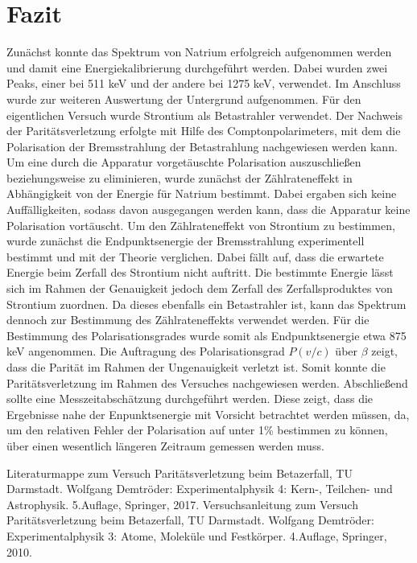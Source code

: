 \documentclass[twoside,colorback,accentcolor=tud4c,11pt]{tudreport}
\begin{document}
\chapter{Fazit}
Zunächst konnte das Spektrum von Natrium erfolgreich aufgenommen werden und damit eine Energiekalibrierung durchgeführt werden. Dabei wurden zwei Peaks, einer bei 511 keV und der andere bei 1275 keV, verwendet. Im Anschluss wurde zur weiteren Auswertung der Untergrund aufgenommen. Für den eigentlichen Versuch wurde Strontium als Betastrahler verwendet. Der Nachweis der Paritätsverletzung erfolgte mit Hilfe des Comptonpolarimeters, mit dem die Polarisation der Bremsstrahlung der Betastrahlung nachgewiesen werden kann. Um eine durch die Apparatur vorgetäuschte Polarisation auszuschließen beziehungsweise zu eliminieren, wurde zunächst der Zählrateneffekt in Abhängigkeit von der Energie für Natrium bestimmt. Dabei ergaben sich keine Auffälligkeiten, sodass davon ausgegangen werden kann, dass die Apparatur keine Polarisation vortäuscht. Um den Zählrateneffekt von Strontium zu bestimmen, wurde zunächst die Endpunktsenergie der Bremsstrahlung experimentell bestimmt und mit der Theorie verglichen. Dabei fällt auf, dass die erwartete Energie beim Zerfall des Strontium nicht auftritt. Die bestimmte Energie lässt sich im Rahmen der Genauigkeit jedoch dem Zerfall des Zerfallsproduktes von Strontium zuordnen. Da dieses ebenfalls ein Betastrahler ist, kann das Spektrum dennoch zur Bestimmung des Zählrateneffekts verwendet werden. Für die Bestimmung des Polarisationsgrades wurde somit als Endpunktsenergie etwa 875 keV angenommen. Die Auftragung des Polarisationsgrad $P(v/c)$ über $\beta$ zeigt, dass die Parität im Rahmen der Ungenauigkeit verletzt ist. Somit konnte die Paritätsverletzung im Rahmen des Versuches nachgewiesen werden. Abschließend sollte eine Messzeitabschätzung durchgeführt werden. Diese zeigt, dass die Ergebnisse nahe der Enpunktsenergie mit Vorsicht betrachtet werden müssen, da, um den relativen Fehler der Polarisation auf unter 1\% bestimmen zu können, über einen wesentlich längeren Zeitraum gemessen werden muss.



		

\renewcommand{\bibname}{Literaturverzeichnis}
\begin{thebibliography}{Bak89}
 Literaturmappe zum Versuch Paritätsverletzung beim Betazerfall, TU Darmstadt.
 Wolfgang Demtröder: Experimentalphysik 4: Kern-, Teilchen- und Astrophysik. 5.Auflage, Springer, 2017.
 Versuchsanleitung zum Versuch Paritätsverletzung beim Betazerfall, TU Darmstadt.
 Wolfgang Demtröder: Experimentalphysik 3: Atome, Moleküle und Festkörper. 4.Auflage, Springer, 2010.




\end{thebibliography} 	
\end{document}
